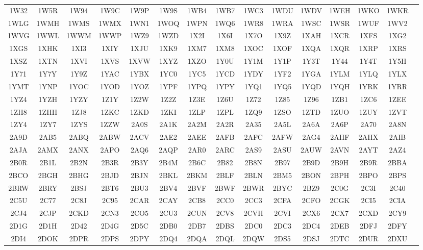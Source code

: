 \begin{longtable}{ c c c c c c c c c c c c c c c }
	1W32 & 1W5R & 1W94 & 1W9C & 1W9P & 1W9S & 1WB4 & 1WB7 & 1WC3 & 1WDU & 1WDV & 1WEH & 1WKO & 1WKR  \\
	1WLG & 1WMH & 1WMS & 1WMX & 1WN1 & 1WOQ & 1WPN & 1WQ6 & 1WR8 & 1WRA & 1WSC & 1WSR & 1WUF & 1WV2  \\
	1WVG & 1WWL & 1WWM & 1WWP & 1WZ9 & 1WZD & 1X2I & 1X6I & 1X7O & 1X9Z & 1XAH & 1XCR & 1XFS & 1XG2  \\
	1XGS & 1XHK & 1XI3 & 1XIY & 1XJU & 1XK9 & 1XM7 & 1XM8 & 1XOC & 1XOF & 1XQA & 1XQR & 1XRP & 1XRS  \\
	1XSZ & 1XTN & 1XVI & 1XVS & 1XVW & 1XYZ & 1XZO & 1Y0U & 1Y1M & 1Y1P & 1Y3T & 1Y44 & 1Y4T & 1Y5H  \\
	1Y71 & 1Y7Y & 1Y9Z & 1YAC & 1YBX & 1YC0 & 1YC5 & 1YCD & 1YDY & 1YF2 & 1YGA & 1YLM & 1YLQ & 1YLX  \\
	1YMT & 1YNP & 1YOC & 1YOD & 1YOZ & 1YPF & 1YPQ & 1YPY & 1YQ1 & 1YQ5 & 1YQD & 1YQH & 1YRK & 1YRR  \\
	1YZ4 & 1YZH & 1YZY & 1Z1Y & 1Z2W & 1Z2Z & 1Z3E & 1Z6U & 1Z72 & 1Z85 & 1Z96 & 1ZB1 & 1ZC6 & 1ZEE  \\
	1ZH8 & 1ZHH & 1ZJ8 & 1ZKC & 1ZKD & 1ZKI & 1ZLP & 1ZPL & 1ZQ9 & 1ZSO & 1ZTD & 1ZUO & 1ZUY & 1ZVT  \\
	1ZY4 & 1ZY7 & 1ZYS & 1ZZW & 2A0S & 2A1K & 2A2M & 2A2R & 2A35 & 2A5L & 2A6A & 2A6P & 2A70 & 2A8N  \\
	2A9D & 2AB5 & 2ABQ & 2ABW & 2ACV & 2AE2 & 2AEE & 2AFB & 2AFC & 2AFW & 2AG4 & 2AHF & 2AHX & 2AIB  \\
	2AJA & 2AMX & 2ANX & 2APO & 2AQ6 & 2AQP & 2AR0 & 2ARC & 2AS9 & 2ASU & 2AUW & 2AVN & 2AYT & 2AZ4  \\
	2B0R & 2B1L & 2B2N & 2B3R & 2B3Y & 2B4M & 2B6C & 2B82 & 2B8N & 2B97 & 2B9D & 2B9H & 2B9R & 2BBA  \\
	2BCO & 2BGH & 2BHG & 2BJD & 2BJN & 2BKL & 2BKM & 2BLF & 2BLN & 2BM5 & 2BON & 2BPH & 2BPO & 2BPS  \\
	2BRW & 2BRY & 2BSJ & 2BT6 & 2BU3 & 2BV4 & 2BVF & 2BWF & 2BWR & 2BYC & 2BZ9 & 2C0G & 2C3I & 2C40  \\
	2C5U & 2C77 & 2C8J & 2C95 & 2CAR & 2CAY & 2CB8 & 2CC0 & 2CC3 & 2CFA & 2CFO & 2CGK & 2CI5 & 2CIA  \\
	2CJ4 & 2CJP & 2CKD & 2CN3 & 2CO5 & 2CU3 & 2CUN & 2CV8 & 2CVH & 2CVI & 2CX6 & 2CX7 & 2CXD & 2CY9  \\
	2D1G & 2D1H & 2D42 & 2D4G & 2D5C & 2DB0 & 2DB7 & 2DBS & 2DC0 & 2DC3 & 2DC4 & 2DEB & 2DFJ & 2DFY  \\
	2DI4 & 2DOK & 2DPR & 2DPS & 2DPY & 2DQ4 & 2DQA & 2DQL & 2DQW & 2DS5 & 2DSJ & 2DTC & 2DUR & 2DXU  \\

\end{longtable}
